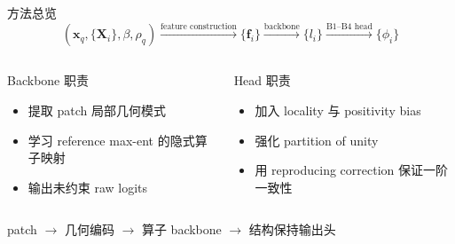 \documentclass[10pt,aspectratio=169]{beamer}
\newcommand{\xq}{\mathbf{x}_q}
\newcommand{\Xnode}{\mathbf{X}_i}
\begin{document}
\begin{frame}{方法总览}
  \[
  \left(\xq,\{\Xnode\},\beta,\rho_q\right)
  \xrightarrow{\text{feature construction}}
  \{\mathbf{f}_i\}
  \xrightarrow{\text{backbone}}
  \{l_i\}
  \xrightarrow{\text{B1--B4 head}}
  \{\phi_i\}
  \]

  \vspace{0.6em}
  \begin{columns}[T,onlytextwidth]
      \begin{block}{Backbone 职责}
        \begin{itemize}
          \item 提取 patch 局部几何模式
          \item 学习 reference max-ent 的隐式算子映射
          \item 输出未约束 raw logits
        \end{itemize}
      \end{block}
      \begin{block}{Head 职责}
        \begin{itemize}
          \item 加入 locality 与 positivity bias
          \item 强化 partition of unity
          \item 用 reproducing correction 保证一阶一致性
        \end{itemize}
      \end{block}
  \end{columns}

  \begin{center}
    \small
    patch $\rightarrow$ 几何编码 $\rightarrow$ 算子 backbone $\rightarrow$ 结构保持输出头
  \end{center}
\end{frame}
\end{document}
